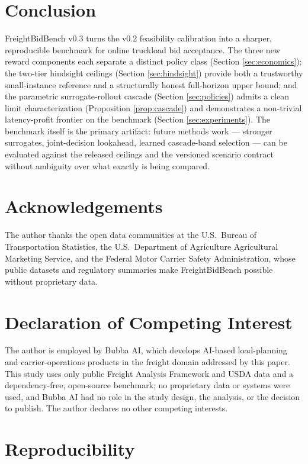\documentclass[11pt]{article}
\begin{document}
\section{Conclusion}

FreightBidBench v0.3 turns the v0.2 feasibility calibration into a
sharper, reproducible benchmark for online truckload bid acceptance. The
three new reward components each separate a distinct policy class
(Section \ref{sec:economics}); the two-tier hindsight ceilings
(Section \ref{sec:hindsight}) provide both a trustworthy small-instance
reference and a structurally honest full-horizon upper bound; and the
parametric surrogate-rollout cascade (Section \ref{sec:policies}) admits a
clean limit characterization (Proposition \ref{prop:cascade}) and
demonstrates a non-trivial latency-profit frontier on the benchmark
(Section \ref{sec:experiments}). The benchmark itself is the primary
artifact: future methods work --- stronger surrogates, joint-decision
lookahead, learned cascade-band selection --- can be evaluated against
the released ceilings and the versioned scenario contract without
ambiguity over what exactly is being compared.

\section*{Acknowledgements}

The author thanks the open data communities at the U.S.\ Bureau of
Transportation Statistics, the U.S.\ Department of Agriculture
Agricultural Marketing Service, and the Federal Motor Carrier Safety
Administration, whose public datasets and regulatory summaries make
FreightBidBench possible without proprietary data.

\section*{Declaration of Competing Interest}

The author is employed by Bubba AI, which develops AI-based load-planning
and carrier-operations products in the freight domain addressed by this
paper. This study uses only public Freight Analysis Framework and USDA data
and a dependency-free, open-source benchmark; no proprietary data or
systems were used, and Bubba AI had no role in the study design, the
analysis, or the decision to publish. The author declares no other
competing interests.

\appendix

\section{Reproducibility}
\label{sec:reproducibility}
\end{document}
